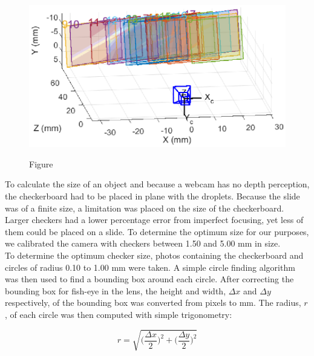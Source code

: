 \documentclass{physics_article_B}
\begin{document}
        \begin{figure}[H]
            \centering
                \includegraphics[]{Figures/CameraExtrinsics.eps}
                \label{fig:calib:pos}
            \caption{Figure }\label{fig:calib}
        \end{figure}
        
        To calculate the size of an object and because a webcam has no depth perception, the checkerboard had to be placed in plane with the droplets. Because the slide was of a finite size, a limitation was placed on the size of the checkerboard. Larger checkers had a lower percentage error from imperfect focusing, yet less of them could be placed on a slide. To determine the optimum size for our purposes, we calibrated the camera with checkers between 1.50 and 5.00 mm in size. \\
        
        To determine the optimum checker size, photos containing the checkerboard and circles of radius 0.10 to 1.00 mm were taken. A simple circle finding algorithm was then used to find a bounding box around each circle. After correcting the bounding box for fish-eye in the lens, the height and width, $\Delta x$ and $\Delta y$ respectively, of the bounding box was converted from pixels to mm. The radius, $r$, of each circle was then computed with simple trigonometry:
        
        \begin{equation}\label{eq:radii}
            r = \sqrt{\Big(\frac{\Delta x}{2}\Big)^2 + \Big(\frac{\Delta y}{2}\Big)^2}
        \end{equation}
        
        \vspace{3pt} 
        
\end{document}
